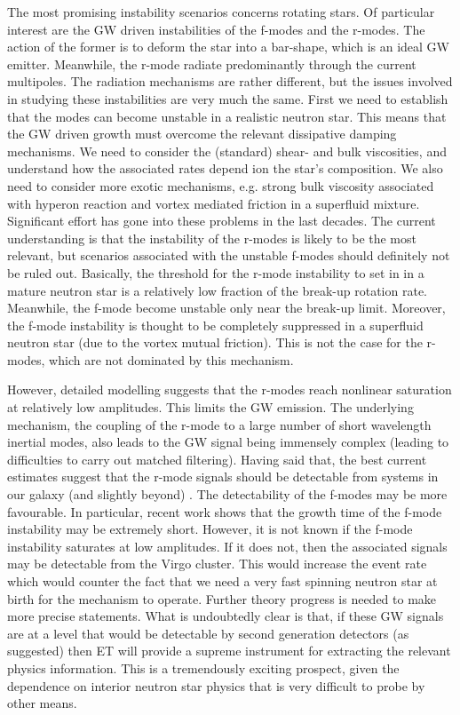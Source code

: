 The most promising instability scenarios concerns rotating stars.  
Of particular interest are the GW driven instabilities of the 
f-modes and the r-modes.  The action of the former is to deform 
the star into a bar-shape, which is an ideal GW emitter.  Meanwhile, 
the r-mode radiate predominantly through the current multipoles. 
The radiation mechanisms are rather different, but the issues 
involved in studying these instabilities are very much the same.  
First we need to establish that the modes can become unstable in 
a realistic neutron star.  This means that the GW driven growth 
must overcome the relevant dissipative damping mechanisms.  We 
need to consider the (standard) shear- and bulk viscosities, and 
understand how the associated rates depend ion the star's 
composition. We also need to consider more exotic mechanisms, e.g. 
strong bulk viscosity associated with hyperon reaction and vortex 
mediated friction in a superfluid mixture. Significant effort has 
gone into these problems in the last decades.  The current 
understanding is that the instability of the r-modes is likely to 
be the most relevant, but scenarios associated with the  unstable 
f-modes should definitely not be ruled out. Basically, the threshold 
for the r-mode instability to set in in a mature neutron star is 
a relatively low fraction of the break-up rotation rate. Meanwhile, 
the f-mode become unstable only near the break-up limit.  Moreover, 
the f-mode instability is thought to be completely suppressed in a 
superfluid neutron star (due to the vortex mutual friction).  This 
is not the case for the r-modes, which are not dominated by this 
mechanism. 

However, detailed modelling suggests that the r-modes reach nonlinear 
saturation at relatively low amplitudes. This limits the GW emission. 
The underlying mechanism, the coupling of the r-mode to a large 
number of short wavelength inertial modes, also leads to the GW 
signal being immensely complex (leading to difficulties to carry 
out matched filtering). Having said that, the best current estimates 
suggest that the r-mode signals should be detectable from systems 
in our galaxy (and slightly beyond) \cite{Bondarescu:2009}.  The 
detectability of the f-modes may be more favourable. In particular, 
recent work shows that the growth time of the f-mode instability 
may be extremely short. However, it is not known if the f-mode 
instability saturates at low amplitudes. If it does not, then the 
associated signals may be detectable from the Virgo cluster. This 
would increase the event rate which would counter the fact that 
we need a very fast spinning neutron star at birth for the mechanism 
to operate.  Further theory progress is needed to make more precise 
statements. What is undoubtedly clear is that, if these GW signals 
are at a level that would be detectable by second generation 
detectors (as suggested) then ET will provide a supreme instrument 
for extracting the relevant physics information. This is a 
tremendously exciting prospect, given the dependence on interior 
neutron star physics that is very difficult to probe by other means.

